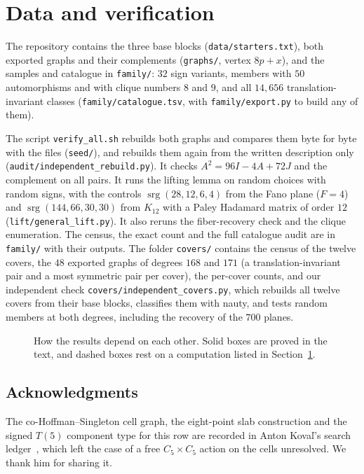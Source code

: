 \documentclass[11pt]{amsart}
\theoremstyle{remark}
\DeclareMathOperator{\srg}{srg}
\begin{document}
\section{Data and verification}\label{sec:data}

The repository contains the three base blocks (\texttt{data/starters.txt}), both exported graphs and their complements (\texttt{graphs/}, vertex $8p+x$), and the samples and catalogue in \texttt{family/}: $32$ sign variants, members with $50$ automorphisms and with clique numbers $8$ and $9$, and all $14{,}656$ translation-invariant classes (\texttt{family/catalogue.tsv}, with \texttt{family/export.py} to build any of them).

\begin{sloppypar}
The script \texttt{verify\_all.sh} rebuilds both graphs and compares them byte for byte with the files (\texttt{seed/}), and rebuilds them again from the written description only (\texttt{audit/independent\_rebuild.py}). It checks $A^2=96I-4A+72J$ and the complement on all pairs. It runs the lifting lemma on random choices with random signs, with the controls $\srg(28,12,6,4)$ from the Fano plane ($F=4$) and $\srg(144,66,30,30)$ from $K_{12}$ with a Paley Hadamard matrix of order $12$ (\texttt{lift/general\_lift.py}). It also reruns the fiber-recovery check and the clique enumeration. The census, the exact count and the full catalogue audit are in \texttt{family/} with their outputs. The folder \texttt{covers/} contains the census of the twelve covers, the $48$ exported graphs of degrees $168$ and $171$ (a translation-invariant pair and a most symmetric pair per cover), the per-cover counts, and our independent check \texttt{covers/independent\_covers.py}, which rebuilds all twelve covers from their base blocks, classifies them with nauty, and tests random members at both degrees, including the recovery of the $700$ planes.
\end{sloppypar}

\begin{figure}[t]
\centering
\resizebox{\textwidth}{!}{}
\caption{How the results depend on each other. Solid boxes are proved in the text, and dashed boxes rest on a computation listed in Section~\ref{sec:data}.}
\label{fig:flow}
\end{figure}

\subsection*{Acknowledgments}
The co-Hoffman--Singleton cell graph, the eight-point slab construction and the signed $T(5)$ component type for this row are recorded in Anton Kova\v{l}'s search ledger~\cite{Kov26}, which left the case of a free $C_5\times C_5$ action on the cells unresolved. We thank him for sharing it.
\end{document}
